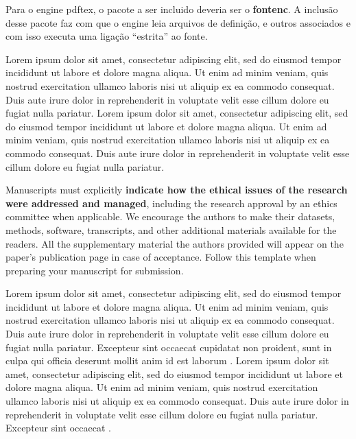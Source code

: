\documentclass[spanish]{sbc2025}%
\begin{document}
Para o engine pdftex, o pacote a ser incluido deveria ser o \textbf{fontenc}. A inclusão desse pacote faz com que o engine leia arquivos de definição, e outros associados e com isso executa uma ligação ``estrita'' ao fonte.  


Lorem ipsum dolor sit amet, consectetur adipiscing elit, sed do eiusmod tempor incididunt ut labore et dolore magna aliqua. Ut enim ad minim veniam, quis nostrud exercitation ullamco laboris nisi ut aliquip ex ea commodo consequat. Duis aute irure dolor in reprehenderit in voluptate velit esse cillum dolore eu fugiat nulla pariatur.  Lorem ipsum dolor sit amet, consectetur adipiscing elit, sed do eiusmod tempor incididunt ut labore et dolore magna aliqua. Ut enim ad minim veniam, quis nostrud exercitation ullamco laboris nisi ut aliquip ex ea commodo consequat. Duis aute irure dolor in reprehenderit in voluptate velit esse cillum dolore eu fugiat nulla pariatur. 

\textcolor{blue!50!black}{%
Manuscripts must explicitly \textbf{indicate how the ethical issues of the research were addressed and managed}, including the research approval by an ethics committee when applicable. We encourage the authors to make their datasets, methods, software, transcripts, and other additional materials available for the readers. All the supplementary material the authors provided will appear on the paper's publication page in case of acceptance. Follow this template when preparing your manuscript for submission.}

Lorem ipsum dolor sit amet, consectetur adipiscing elit, sed do eiusmod tempor incididunt ut labore et dolore magna aliqua. Ut enim ad minim veniam, quis nostrud exercitation ullamco laboris nisi ut aliquip ex ea commodo consequat. Duis aute irure dolor in reprehenderit in voluptate velit esse cillum dolore eu fugiat nulla pariatur. Excepteur sint occaecat cupidatat non proident, sunt in culpa qui officia deserunt mollit anim id est laborum \citep{ref1}. Lorem ipsum dolor sit amet, consectetur adipiscing elit, sed do eiusmod tempor incididunt ut labore et dolore magna aliqua. Ut enim ad minim veniam, quis nostrud exercitation ullamco laboris nisi ut aliquip ex ea commodo consequat. Duis aute irure dolor in reprehenderit in voluptate velit esse cillum dolore eu fugiat nulla pariatur. Excepteur sint occaecat \citep{ref2}. 
\end{document}
